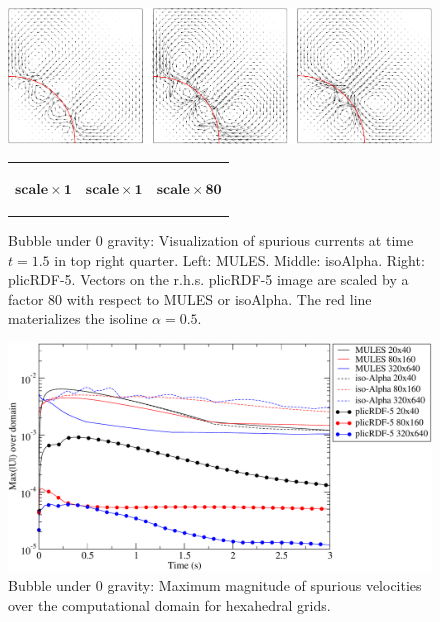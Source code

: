 \documentclass[review]{elsarticle}
\begin{document}
\begin{figure}[!h]
 \begin{center}
   \vspace{-1mm}
   \includegraphics[width=\textwidth]{figures/spuriousCurrents_MULES_vs_isoAlpha_vs_plicRDF-5-scaleX80_time=1p5_080x160_quarter.png}
 \end{center}
 \vspace{-11mm}
 \begin{tabular}{p{}p{}p{}}
    \begin{center}
    $\mathbf{scale \times 1}$
    \end{center} 
    & 
    \begin{center}
    $\mathbf{scale \times 1}$ 
    \end{center} 
    & 
    \begin{center}
    $\mathbf{scale \times 80}$
    \end{center}
    \\
 \end{tabular}
 \vspace{-11mm}
\caption{Bubble under 0 gravity: Visualization of spurious currents at time $t=1.5$ in top right quarter. Left: MULES. Middle: isoAlpha. Right: plicRDF-5. Vectors on the r.h.s. plicRDF-5 image are scaled by a factor 80 with respect to MULES or isoAlpha. The red line materializes the isoline $\alpha=0.5$.}
\label{fig:spuriousCurrents_velocityField}
\end{figure}

\begin{figure}[!h]
  \includegraphics[width=\textwidth]{figures/spuriousCurrents_MaxmagU_compareOF_20_80_320_struct.pdf}
  \caption{Bubble under 0 gravity: Maximum magnitude of spurious velocities over the computational domain for hexahedral grids.}
  \label{fig:spuriousCurrents_MaxmagU_struct}
\end{figure}
\end{document}
